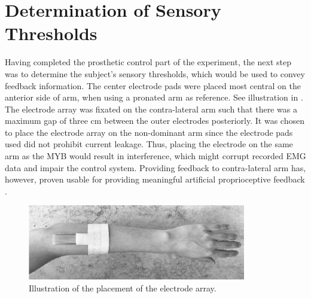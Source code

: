 
\section{Determination of Sensory Thresholds}

Having completed the prosthetic control part of the experiment, the next step was to determine the subject's sensory thresholds, which would be used to convey feedback information. The center electrode pads were placed most central on the anterior side of arm, when using a pronated arm as reference. See illustration in . The electrode array was fixated on the contra-lateral arm such that there was a maximum gap of three cm between the outer electrodes posteriorly. It was chosen to place the electrode array on the non-dominant arm since the electrode pads used did not prohibit current leakage. Thus, placing the electrode on the same arm as the MYB would result in interference, which might corrupt recorded EMG data and impair the control system. Providing feedback to contra-lateral arm has, however, proven usable for providing meaningful artificial proprioceptive feedback \cite{Pistohl2015}.  

\begin{figure}[H]                 
	\includegraphics[width=0.85\textwidth]{figures/elec_place}  
	\caption{Illustration of the placement of the electrode array.}
	\label{fig:meth:elec_place} 
\end{figure}

